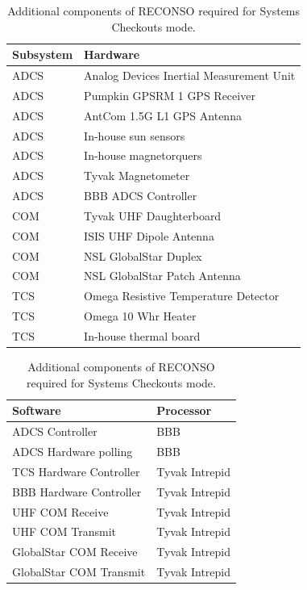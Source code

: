 \documentclass{article}
\begin{document}
\begin{table}[h!]
\caption{Additional components of RECONSO required for Systems Checkouts mode.}
\begin{adjustbox}{center}
\begin{tabular}{|l|l|}
\hline
Subsystem & Hardware \\ \hline \hline
ADCS & Analog Devices Inertial Measurement Unit  \\ \hline
ADCS & Pumpkin GPSRM 1 GPS Receiver \\ \hline
ADCS & AntCom 1.5G L1 GPS Antenna  \\ \hline
ADCS & In-house sun sensors  \\ \hline
ADCS & In-house magnetorquers  \\ \hline
ADCS & Tyvak Magnetometer \\ \hline
ADCS & BBB ADCS Controller \\ \hline \hline
COM & Tyvak UHF Daughterboard  \\ \hline
COM & ISIS UHF Dipole Antenna  \\ \hline
COM & NSL GlobalStar Duplex  \\ \hline
COM & NSL GlobalStar Patch Antenna \\ \hline \hline
TCS & Omega Resistive Temperature Detector \\ \hline
TCS & Omega 10 Whr Heater  \\ \hline
TCS & In-house thermal board \\ \hline
\end{tabular}

\quad

\begin{tabular}{|l|l|}
\hline
Software & Processor \\ \hline \hline
ADCS Controller & BBB \\ \hline
ADCS Hardware polling & BBB \\ \hline \hline
TCS Hardware Controller & Tyvak Intrepid \\ \hline
BBB Hardware Controller & Tyvak Intrepid \\ \hline
UHF COM Receive & Tyvak Intrepid \\ \hline
UHF COM Transmit & Tyvak Intrepid \\ \hline
GlobalStar COM Receive & Tyvak Intrepid \\ \hline
GlobalStar COM Transmit & Tyvak Intrepid \\ \hline
\end{tabular}
\end{adjustbox}
\end{table}
\end{document}
